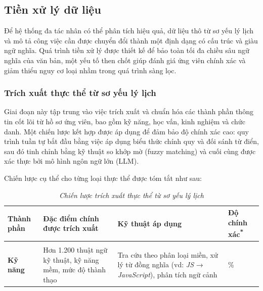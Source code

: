 \documentclass{article}
\begin{document}
\begin{itemize}[topsep=0pt, itemsep=4pt, leftmargin=40pt]
\subsection{Tiền xử lý dữ liệu}
Để hệ thống đa tác nhân có thể phân tích hiệu quả, dữ liệu thô từ sơ yếu lý lịch và mô tả công việc cần được chuyển đổi thành một định dạng có cấu trúc và giàu ngữ nghĩa. Quá trình tiền xử lý được thiết kế để bảo toàn tối đa chiều sâu ngữ nghĩa của văn bản, một yếu tố then chốt giúp đánh giá ứng viên chính xác và giảm thiểu nguy cơ loại nhầm trong quá trình sàng lọc.

\subsubsection{Trích xuất thực thể từ sơ yếu lý lịch}
Giai đoạn này tập trung vào việc trích xuất và chuẩn hóa các thành phần thông tin cốt lõi từ hồ sơ ứng viên, bao gồm kỹ năng, học vấn, kinh nghiệm và chức danh. Một chiến lược kết hợp được áp dụng để đảm bảo độ chính xác cao: quy trình tuần tự bắt đầu bằng việc áp dụng biểu thức chính quy và đối sánh từ điển, sau đó tinh chỉnh bằng kỹ thuật so khớp mờ (fuzzy matching) và cuối cùng được xác thực bởi mô hình ngôn ngữ lớn (LLM).

Chiến lược cụ thể cho từng loại thực thể được tóm tắt như sau:
\begin{longtable}{|
  >{\raggedright\arraybackslash}p{}|
  >{\raggedright\arraybackslash}p{}|
  >{\raggedright\arraybackslash}p{}|
  >{\centering\arraybackslash}p{}|}
  \hline
  \textbf{Thành phần} &
  \textbf{Đặc điểm chính được trích xuất} &
  \textbf{Kỹ thuật áp dụng} &
  \textbf{Độ chính xác\textsuperscript{*}} \\
  \hline
  \endfirsthead

  \endhead

  \hline
  \endfoot

  \hline
  \caption{\centering\textit{Chiến lược trích xuất thực thể từ sơ yếu lý lịch}}
  \label{tab:extraction-strategy} \\
  \endlastfoot

  \textbf{Kỹ năng} &
  Hơn 1.200 thuật ngữ kỹ thuật, kỹ năng mềm, mức độ thành thạo &
  Tra cứu theo phân loại miền, xử lý từ đồng nghĩa (vd: \textit{JS} → \textit{JavaScript}), phân tích ngữ cảnh &
  94\% \\
  \hline


\end{longtable}
\end{itemize}
\end{document}
